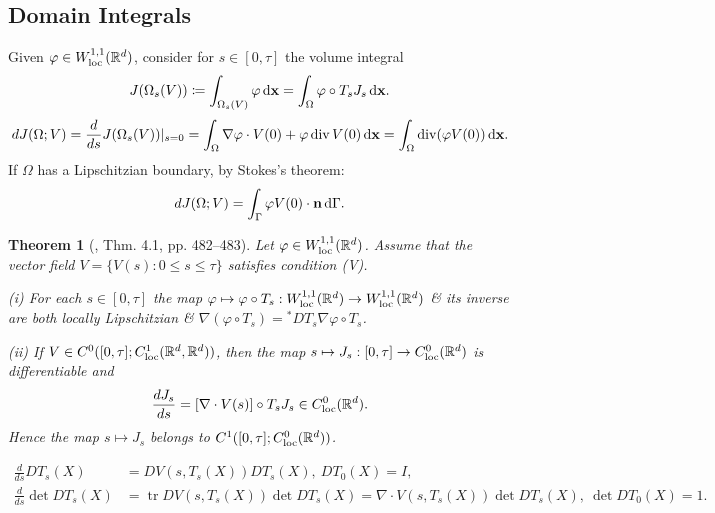 \documentclass{article}
\newtheorem{theorem}{Theorem}
\begin{document}
\subsection{Domain Integrals}

\begin{itemize}
	\item Given $\varphi\in W_{\rm loc}^{1,1}(\mathbb{R}^d)$, consider for $s\in[0,\tau]$ the volume integral
	\begin{equation}
		J(\Omega_s(V))\coloneqq\int_{\Omega_s(V)} \varphi\,{\rm d}{\bf x} = \int_\Omega \varphi\circ T_sJ_s\,{\rm d}{\bf x}.
	\end{equation}
	\begin{equation}
		dJ(\Omega;V) = \frac{d}{ds}J(\Omega_s(V))|_{s = 0} = \int_\Omega \nabla\varphi\cdot V(0) + \varphi\operatorname{div}V(0)\,{\rm d}{\bf x} = \int_\Omega \operatorname{div}(\varphi V(0))\,{\rm d}{\bf x}.
	\end{equation}
	If $\Omega$ has a Lipschitzian boundary, by Stokes's theorem:
	\begin{equation}
		dJ(\Omega;V) = \int_\Gamma \varphi V(0)\cdot{\bf n}\,{\rm d}\Gamma.
	\end{equation}

	\begin{theorem}[\cite{Delfour_Zolesio2011}, Thm. 4.1, pp. 482--483]
		Let $\varphi\in W_{\rm loc}^{1,1}(\mathbb{R}^d)$. Assume that the vector field $V = \{V(s):0\le s\le\tau\}$ satisfies condition (V).
		\item[(i)] For each $s\in[0,\tau]$ the map $\varphi\mapsto\varphi\circ T_s:W_{\rm loc}^{1,1}(\mathbb{R}^d)\to W_{\rm loc}^{1,1}(\mathbb{R}^d)$ \& its inverse are both locally Lipschitzian \& $\nabla(\varphi\circ T_s) = {}^*DT_s\nabla\varphi\circ T_s$.
		\item[(ii)] If $V\in C^0([0,\tau];C_{\rm loc}^1(\mathbb{R}^d,\mathbb{R}^d))$, then the map $s\mapsto J_s:[0,\tau]\to C_{\rm loc}^0(\mathbb{R}^d)$ is differentiable and
		\begin{equation}
			\frac{dJ_s}{ds} = [\nabla\cdot V(s)]\circ T_sJ_s\in C_{\rm loc}^0(\mathbb{R}^d).
		\end{equation}
		Hence the map $s\mapsto J_s$ belongs to $C^1([0,\tau];C_{\rm loc}^0(\mathbb{R}^d))$.
	\end{theorem}

	\begin{align}
		\frac{d}{ds}DT_s(X) &= DV(s,T_s(X))DT_s(X),\ DT_0(X) = I,\\
		\frac{d}{ds}\det DT_s(X) &= \operatorname{tr}DV(s,T_s(X))\det DT_s(X) = \nabla\cdot V(s,T_s(X))\det DT_s(X),\ \det DT_0(X) = 1.
	\end{align}


\end{itemize}
\end{document}
